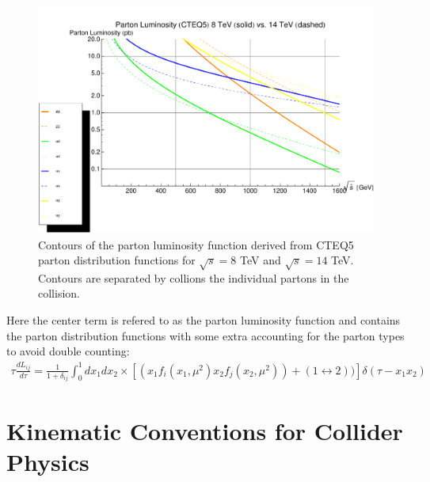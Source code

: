 \begin{figure}
\begin{center}
\includegraphics[width=.95\textwidth]{pics/parton_lumi_8TeV_14TeV}
\end{center}
\caption{Contours of the parton luminosity function derived from CTEQ5 parton distribution functions for $\sqrt{s}=8$ TeV and
$\sqrt{s}=14$ TeV. Contours are separated by collions the individual partons in the collision.  }
\label{fig:deltaRcones}
\end{figure}

Here the center term is refered to as the parton luminosity function and contains the parton distribution functions with
some extra accounting for the parton types to avoid double counting:
\begin{align*}
\tau\frac{dL_{ij}}{d\tau} = \frac{1}{1+\delta_{ij}} \int_0^1 dx_1 dx_2 \times \left [ (x_1 f_i(x_1,\mu^2) x_2 f_j(x_2,\mu^2)) + (1 \leftrightarrow 2)) \right ] \delta(\tau - x_1x_2) 
\end{align*}

\section{Kinematic Conventions for Collider Physics} 

